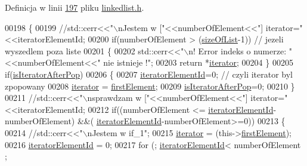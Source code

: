 Definicja w linii \hyperlink{linkedlist_8h_source_l00197}{197} pliku \hyperlink{linkedlist_8h_source}{linkedlist.\-h}.


\begin{DoxyCode}
00198         \{
00199                 \textcolor{comment}{//std::cerr<<"\(\backslash\)nJestem w ["<<numberOfElement<<"] iterator="<<iteratorElementId;}
00200                 \textcolor{keywordflow}{if}(numberOfElement > (\hyperlink{class_linked_list_acfd83fe531d962d6260a633dfca98a9f}{sizeOfList}-1)) \textcolor{comment}{// jezeli wyszedlem poza liste}
00201                         \{
00202                                 std::cerr<<\textcolor{stringliteral}{"\(\backslash\)n! Error indeks o numerze: "}<<numberOfElement<<\textcolor{stringliteral}{" nie istnieje
       !"};
00203                                 \textcolor{keywordflow}{return} *\hyperlink{class_linked_list_a6f117a991b3e2e020f43807500b45f5f}{iterator};
00204                         \}
00205                 \textcolor{keywordflow}{if}(\hyperlink{class_linked_list_a8d354ba516e8270027bf617b121b49fe}{isIteratorAfterPop})
00206                         \{
00207                                 \hyperlink{class_linked_list_a6398cec56a986426925e4e651bc4725c}{iteratorElementId}=0;  \textcolor{comment}{// czyli iterator byl zpopowany}
00208                                 \hyperlink{class_linked_list_a6f117a991b3e2e020f43807500b45f5f}{iterator} = \hyperlink{class_linked_list_a51c0816c49528a63eea2adae2d503ada}{firstElement};
00209                                 \hyperlink{class_linked_list_a8d354ba516e8270027bf617b121b49fe}{isIteratorAfterPop}=0;
00210                         \}
00211                 \textcolor{comment}{//std::cerr<<"\(\backslash\)nsprawdzam w ["<<numberOfElement<<"] iterator="<<iteratorElementId;}
00212                 \textcolor{keywordflow}{if}((numberOfElement <= \hyperlink{class_linked_list_a6398cec56a986426925e4e651bc4725c}{iteratorElementId}-numberOfElement) &&(
      \hyperlink{class_linked_list_a6398cec56a986426925e4e651bc4725c}{iteratorElementId}-numberOfElement>=0))
00213                 \{
00214                         \textcolor{comment}{//std::cerr<<"\(\backslash\)nJestem w if\_1";}
00215                         \hyperlink{class_linked_list_a6f117a991b3e2e020f43807500b45f5f}{iterator} = (this->\hyperlink{class_linked_list_a51c0816c49528a63eea2adae2d503ada}{firstElement});
00216                         \hyperlink{class_linked_list_a6398cec56a986426925e4e651bc4725c}{iteratorElementId} = 0;
00217                         \textcolor{keywordflow}{for} (; \hyperlink{class_linked_list_a6398cec56a986426925e4e651bc4725c}{iteratorElementId}< numberOfElement ; 

\end{DoxyCode}
